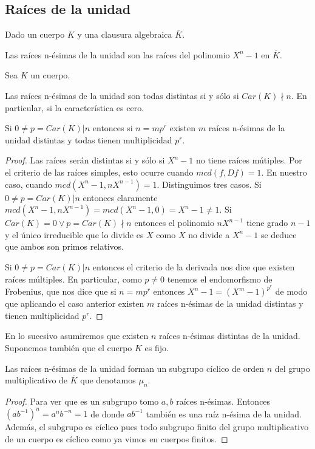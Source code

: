 \subsection{Raíces de la unidad}

\begin{definition}
Dado un cuerpo $K$ y una clausura algebraica $\overline{K}$. 

Las raíces n-ésimas de la unidad son las raíces del polinomio $X^n-1$ en $\overline{K}$.
\end{definition}

\begin{proposition}
Sea $K$ un cuerpo. 

Las raíces n-ésimas de la unidad son todas distintas si y sólo si $Car(K) \nmid n$. En particular, si la característica es cero. 

Si $0 \neq p = Car(K) | n$ entonces si $n = mp^r$ existen $m$ raíces n-ésimas de la unidad distintas y todas tienen multiplicidad $p^r$. 
\end{proposition}
\begin{proof}
Las raíces serán distintas si y sólo si $X^n - 1$ no tiene raíces mútiples. Por el criterio de las raíces simples, esto ocurre cuando $mcd(f,Df) = 1$. En nuestro caso, cuando $mcd(X^n - 1,nX^{n-1}) = 1$. Distinguimos tres casos. Si $0 \neq p = Car(K) | n$ entonces claramente $mcd(X^n - 1,nX^{n-1}) = mcd(X^n - 1,0) = X^n - 1 \neq 1$. Si $Car(K) = 0 \lor p = Car(K) \nmid n$ entonces el polinomio $nX^{n-1}$ tiene grado $n-1$ y el único irreducible que lo divide es $X$ como $X$ no divide a $X^n - 1$ se deduce que ambos son primos relativos. 

Si $0 \neq p = Car(K) | n$ entonces el criterio de la derivada nos dice que existen raíces múltiples. En particular, como $p \neq 0$ tenemos el endomorfismo de Frobenius, que nos dice que si $n = mp^r$ entonces $X^n - 1 = (X^m - 1)^{p^r}$ de modo que aplicando el caso anterior existen $m$ raíces n-ésimas de la unidad distintas y tienen multiplicidad $p^r$. 
\end{proof}

En lo sucesivo asumiremos que existen $n$ raíces n-ésimas distintas de la unidad. Suponemos también que el cuerpo $K$ es fijo. 

\begin{proposition}
Las raíces n-ésimas de la unidad forman un subgrupo cíclico de orden $n$ del grupo multiplicativo de $\overline{K}$ que denotamos $\mu_n$.
\end{proposition}
\begin{proof}
Para ver que es un subgrupo tomo $a,b$ raíces n-ésimas. Entonces $(ab^{-1})^n = a^nb^{-n} = 1$ de donde $ab^{-1}$ también es una raíz n-ésima de la unidad. Además, el subgrupo es cíclico pues todo subgrupo finito del grupo multiplicativo de un cuerpo es cíclico como ya vimos en cuerpos finitos. 
\end{proof}

